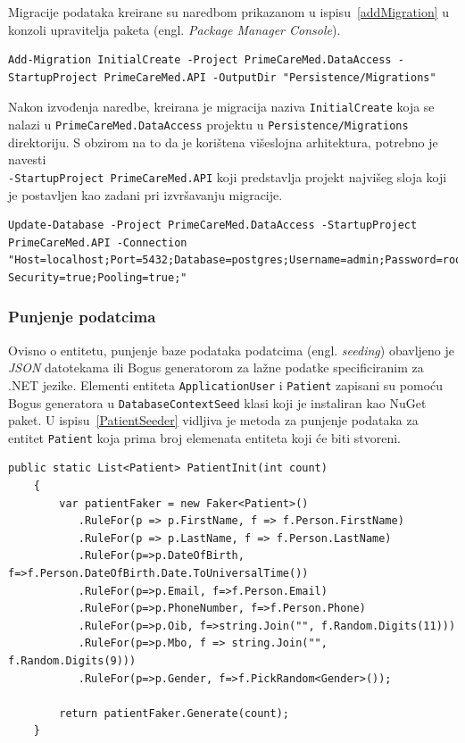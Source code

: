 Migracije podataka kreirane su naredbom prikazanom u ispisu~\ref{addMigration} u konzoli upravitelja paketa (engl. \textit{Package Manager Console}). 

\begin{lstlisting}[caption={Naredba za kreiranje migracije}, label=addMigration]
Add-Migration InitialCreate -Project PrimeCareMed.DataAccess -StartupProject PrimeCareMed.API -OutputDir "Persistence/Migrations"
\end{lstlisting}

Nakon izvođenja naredbe, kreirana je migracija naziva \texttt{InitialCreate} koja se nalazi u \texttt{PrimeCareMed.DataAccess} projektu u \texttt{Persistence/Migrations} direktoriju. S obzirom na to da je korištena višeslojna arhitektura, potrebno je navesti\\\texttt{-StartupProject PrimeCareMed.API} koji predstavlja projekt najvišeg sloja koji je postavljen kao zadani pri izvršavanju migracije.

\begin{lstlisting}[caption={Primjena migracije na bazu podataka}, label=updateDatabase]
Update-Database -Project PrimeCareMed.DataAccess -StartupProject PrimeCareMed.API -Connection "Host=localhost;Port=5432;Database=postgres;Username=admin;Password=root;Integrated Security=true;Pooling=true;"
\end{lstlisting}

\subsubsection{Punjenje podatcima}
Ovisno o entitetu, punjenje baze podataka podatcima (engl. \textit{seeding}) obavljeno je \textit{JSON} datotekama ili Bogus generatorom za lažne podatke specificiranim za .NET jezike. Elementi entiteta \texttt{ApplicationUser} i \texttt{Patient} zapisani su pomoću Bogus generatora u \texttt{DatabaseContextSeed} klasi koji je instaliran kao NuGet paket. U ispisu~\ref{PatientSeeder} vidljiva je metoda za punjenje podataka za entitet \texttt{Patient} koja prima broj elemenata entiteta koji će biti stvoreni.  \cite{bogus1}

\begin{lstlisting}[caption={\texttt{PatientInit} metoda za punjenje lažnih podataka}, label=PatientSeeder]
    public static List<Patient> PatientInit(int count)
    {
        var patientFaker = new Faker<Patient>()
           .RuleFor(p => p.FirstName, f => f.Person.FirstName)
           .RuleFor(p => p.LastName, f => f.Person.LastName)
           .RuleFor(p=>p.DateOfBirth, f=>f.Person.DateOfBirth.Date.ToUniversalTime())
           .RuleFor(p=>p.Email, f=>f.Person.Email)
           .RuleFor(p=>p.PhoneNumber, f=>f.Person.Phone)
           .RuleFor(p=>p.Oib, f=>string.Join("", f.Random.Digits(11)))
           .RuleFor(p=>p.Mbo, f => string.Join("", f.Random.Digits(9)))
           .RuleFor(p=>p.Gender, f=>f.PickRandom<Gender>());

        return patientFaker.Generate(count);
    }
\end{lstlisting}

